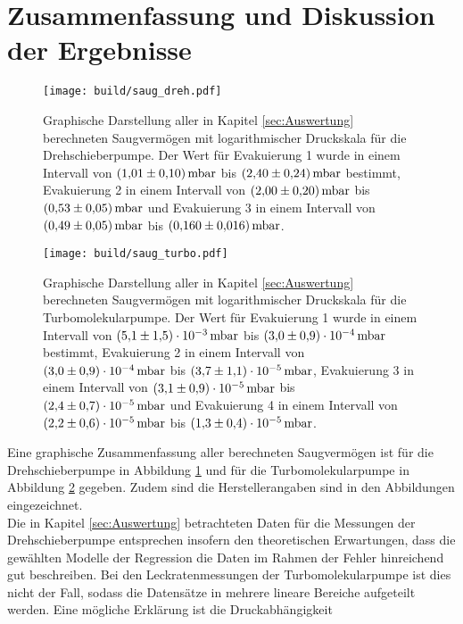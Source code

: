 \section{Zusammenfassung und Diskussion der Ergebnisse}
\label{sec:Diskussion}
\begin{figure}[ht]
        \centering
        \texttt{[image: build/saug\_dreh.pdf]}
        \caption{Graphische Darstellung aller in Kapitel \ref{sec:Auswertung} berechneten Saugvermögen mit logarithmischer Druckskala für die Drehschieberpumpe. Der Wert für Evakuierung 1 wurde in einem Intervall von ${\SI{1.01 \pm 0.10}{\milli\bar}}$ bis ${\SI{2.40\pm 0.24}{\milli\bar}}$ bestimmt, Evakuierung 2 in einem Intervall von ${\SI{2.00 \pm 0.20}{\milli\bar}}$ bis ${\SI{0.53\pm 0.05}{\milli\bar}}$ und Evakuierung 3 in einem Intervall von ${\SI{0.49 \pm 0.05}{\milli\bar}}$ bis ${\SI{0.160 \pm 0.016}{\milli\bar}}$.}
        \label{fig:saug_dreh}
\end{figure}
\begin{figure}
        \centering
        \texttt{[image: build/saug\_turbo.pdf]}
        \caption{Graphische Darstellung aller in Kapitel \ref{sec:Auswertung} berechneten Saugvermögen mit logarithmischer Druckskala für die Turbomolekularpumpe. Der Wert für Evakuierung 1 wurde in einem Intervall von ${\SI{5.1 \pm 1.5 e-3}{\milli\bar}}$ bis ${\SI{3.0 \pm 0.9 e-4}{\milli\bar}}$ bestimmt, Evakuierung 2 in einem Intervall von ${\SI{3.0 \pm 0.9 e-4}{\milli\bar}}$ bis ${\SI{3.7 \pm 1.1 e-5}{\milli\bar}}$, Evakuierung 3 in einem Intervall von ${\SI{3.1 \pm 0.9 e-5}{\milli\bar}}$ bis ${\SI{2.4 \pm 0.7 e-5}{\milli\bar}}$ und Evakuierung 4 in einem Intervall von ${\SI{2.2 \pm 0.6 e-5}{\milli\bar}}$ bis ${\SI{1.3 \pm 0.4 e-5}{\milli\bar}}$.}
        \label{fig:saug_turbo}
\end{figure}
\noindent
Eine graphische Zusammenfassung aller berechneten Saugvermögen ist für die Drehschieberpumpe in 
Abbildung \ref{fig:saug_dreh} und für die Turbomolekularpumpe in Abbildung \ref{fig:saug_turbo} 
gegeben. Zudem sind die Herstellerangaben sind in den Abbildungen eingezeichnet.
\\
Die in Kapitel \ref{sec:Auswertung} betrachteten Daten für die Messungen der Drehschieberpumpe 
entsprechen insofern den theoretischen Erwartungen, dass die gewählten 
Modelle der Regression die Daten im Rahmen der Fehler hinreichend gut beschreiben.
Bei den Leckratenmessungen der Turbomolekularpumpe ist dies nicht der Fall, sodass die Datensätze 
in mehrere lineare Bereiche aufgeteilt werden. Eine mögliche Erklärung ist die Druckabhängigkeit 
